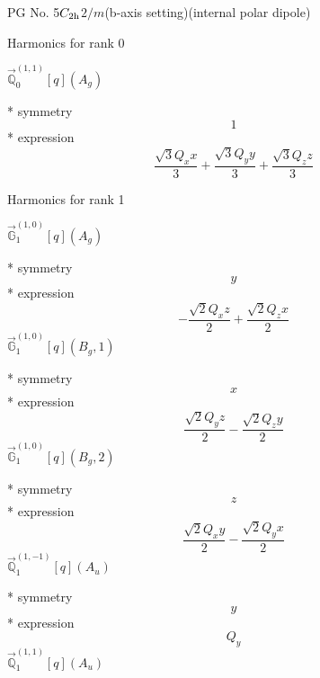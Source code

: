 \documentclass[fleqn,8pt]{jsarticle}
\begin{document}
\setcounter{MaxMatrixCols}{32}

\renewcommand{\tablename}{Table~}
\renewcommand{\figurename}{Figure~}
\begin{center}
\LARGE
PG No. 5\quad$C_{\rm 2h}$\quad$2/m$\quad(b-axis setting)\quad[ monoclinic ] (internal polar dipole)
\end{center}

\noindent * Harmonics for rank 0

\noindent\quad $\vec{\mathbb{Q}}_{0}^{(1,1)}[q](A_{g})$

\noindent\quad ** symmetry
\begin{dmath*}
1
\end{dmath*}
\noindent\quad ** expression
\begin{dmath*}
\frac{\sqrt{3} Q_{x} x}{3} + \frac{\sqrt{3} Q_{y} y}{3} + \frac{\sqrt{3} Q_{z} z}{3}
\end{dmath*}

\noindent * Harmonics for rank 1

\noindent\quad $\vec{\mathbb{G}}_{1}^{(1,0)}[q](A_{g})$

\noindent\quad ** symmetry
\begin{dmath*}
y
\end{dmath*}
\noindent\quad ** expression
\begin{dmath*}
- \frac{\sqrt{2} Q_{x} z}{2} + \frac{\sqrt{2} Q_{z} x}{2}
\end{dmath*}
\noindent\quad $\vec{\mathbb{G}}_{1}^{(1,0)}[q](B_{g},1)$

\noindent\quad ** symmetry
\begin{dmath*}
x
\end{dmath*}
\noindent\quad ** expression
\begin{dmath*}
\frac{\sqrt{2} Q_{y} z}{2} - \frac{\sqrt{2} Q_{z} y}{2}
\end{dmath*}
\noindent\quad $\vec{\mathbb{G}}_{1}^{(1,0)}[q](B_{g},2)$

\noindent\quad ** symmetry
\begin{dmath*}
z
\end{dmath*}
\noindent\quad ** expression
\begin{dmath*}
\frac{\sqrt{2} Q_{x} y}{2} - \frac{\sqrt{2} Q_{y} x}{2}
\end{dmath*}
\noindent\quad $\vec{\mathbb{Q}}_{1}^{(1,-1)}[q](A_{u})$

\noindent\quad ** symmetry
\begin{dmath*}
y
\end{dmath*}
\noindent\quad ** expression
\begin{dmath*}
Q_{y}
\end{dmath*}
\noindent\quad $\vec{\mathbb{Q}}_{1}^{(1,1)}[q](A_{u})$
\end{document}
